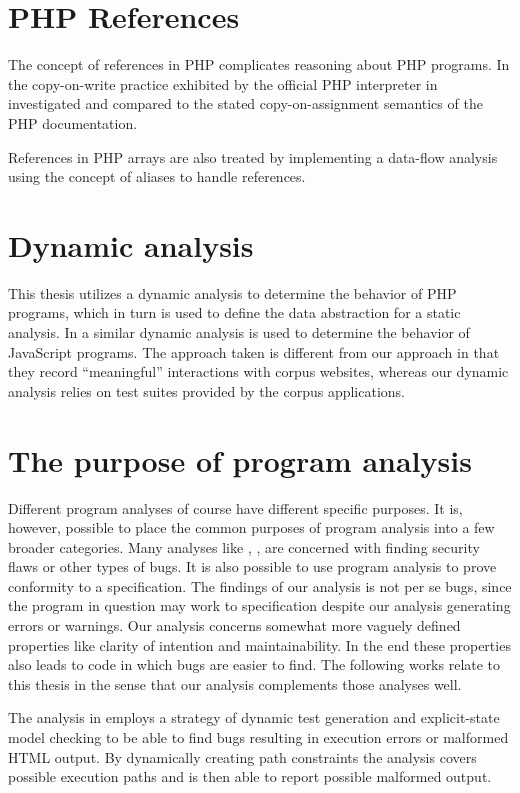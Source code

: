 \section{PHP References}
The concept of references in PHP complicates reasoning about PHP programs. In  the copy-on-write practice exhibited by the official PHP interpreter in investigated and compared to the stated copy-on-assignment semantics of the PHP documentation.

References in PHP arrays are also treated by  implementing a data-flow analysis using the concept of aliases to handle references. 

\section{Dynamic analysis}
This thesis utilizes a dynamic analysis to determine the behavior of PHP programs, which in turn is used to define the data abstraction for a static analysis. In  a similar dynamic analysis is used to determine the behavior of JavaScript programs. The approach taken is different from our approach in that they record ``meaningful'' interactions with corpus websites, whereas our dynamic analysis relies on test suites provided by the corpus applications.



\section{The purpose of program analysis}
Different program analyses of course have different specific purposes. It is, however, possible to place the common purposes of program analysis into a few broader categories. Many analyses like , , are concerned with finding security flaws or other types of bugs. It is also possible to use program analysis to prove conformity to a specification. The findings of our analysis is not per se bugs, since the program in question may work to specification despite our analysis generating errors or warnings. Our analysis concerns somewhat more vaguely defined properties like clarity of intention and maintainability. In the end these properties also leads to code in which bugs are easier to find. The following works relate to this thesis in the sense that our analysis complements those analyses well.

The analysis in  employs a strategy of dynamic test generation and explicit-state model checking to be able to find bugs resulting in execution errors or malformed HTML output. By dynamically creating path constraints the analysis covers possible execution paths and is then able to report possible malformed output.

